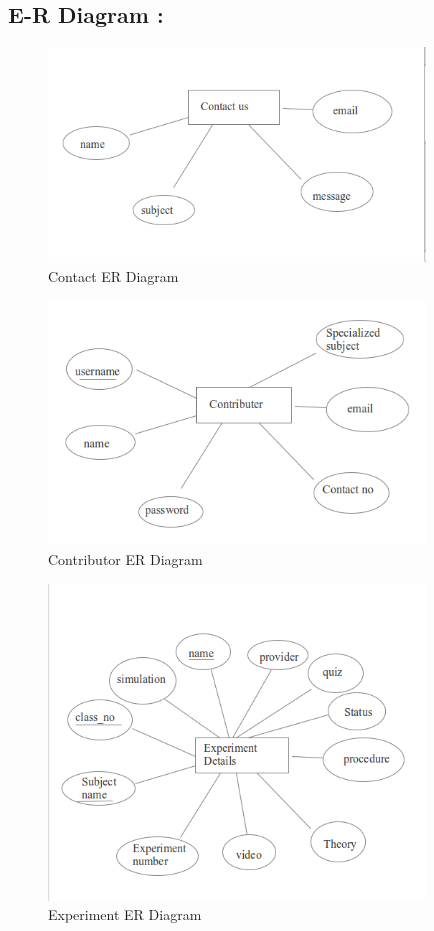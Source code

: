 \documentclass[12pt]{report}
\begin{document}
\subsection{E-R Diagram :}

\begin{figure}[H]
 \centering
 \includegraphics[width=10cm]{./er_contact.png}
 \caption{Contact ER Diagram\label{fig:er_contact}}
\end{figure}

\begin{figure}[H]
 \centering
 \includegraphics[width=10cm]{./er_contributer.png}
 \caption{Contributor ER Diagram\label{fig:er_contributer}}
\end{figure}

\begin{figure}[H]
 \centering
 \includegraphics[width=10cm]{./er_experiment.png}
 \caption{Experiment ER Diagram\label{fig:er_experiment}}
\end{figure}
\end{document}
